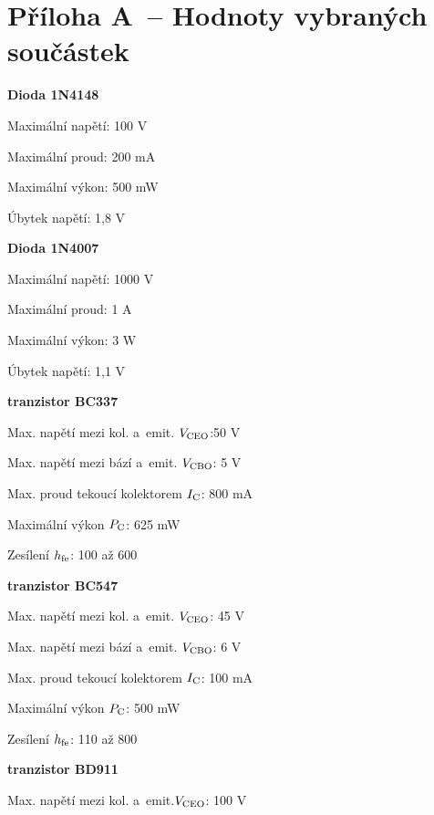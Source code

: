 \section{Příloha A~-- Hodnoty vybraných součástek}

\hypertarget{1N4148}{}
{\bf Dioda 1N4148}  

Maximální napětí: 100 V

Maximální proud: 200 mA

Maximální výkon:  500 mW

Úbytek napětí: 1,8 V

\vskip 2mm

\hypertarget{1N4007}{}
{\bf Dioda 1N4007} 

Maximální napětí: 1000 V

Maximální proud: 1 A

Maximální výkon: 3 W

Úbytek napětí: 1,1 V

\vskip 2mm

\hypertarget{BCC337}{}
{\bf tranzistor BC337} 

Max. napětí mezi kol. a~emit. $V \rm _{CEO}$:50 V

Max. napětí mezi bází a~emit. $V \rm _{CBO}$: 5 V

Max. proud tekoucí kolektorem $I \rm _C$: 800 mA

Maximální výkon $ P \rm _C$: 625 mW

Zesílení $ h \rm _{fe}$: 100 až 600

\vskip 2mm

\hypertarget{BCC547}{}
{\bf tranzistor BC547} 

Max. napětí mezi kol. a~emit. $ V \rm_{CEO}$: 45 V

Max. napětí mezi bází a~emit. $ V \rm _{CBO}$: 6 V
 
Max. proud tekoucí kolektorem $ I \rm _C$: 100 mA

Maximální výkon $P \rm _C$: 500 mW

Zesílení $h \rm _{fe}$: 110 až 800

\vskip 2mm

\hypertarget{BD911}{}
{\bf tranzistor BD911}  

Max. napětí mezi kol. a~emit.$V \rm _{CEO}$: 100 V

